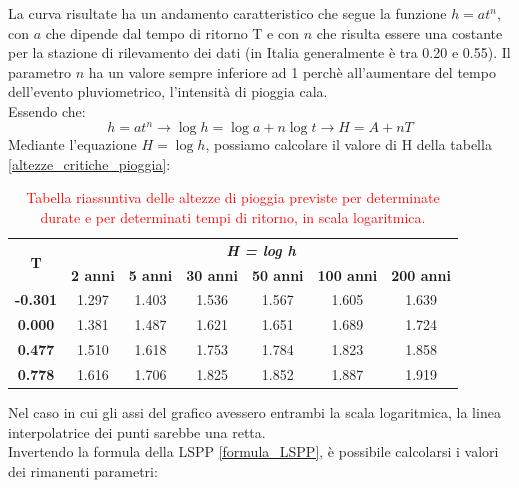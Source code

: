 La curva risultate ha un andamento caratteristico che segue la funzione $h=at^n$, con $a$ che dipende dal tempo di ritorno T e con $n$ che risulta essere una costante per la stazione di rilevamento dei dati (in Italia generalmente è tra 0.20 e 0.55). Il parametro $n$ ha un valore sempre inferiore ad 1 perchè all'aumentare del tempo dell'evento pluviometrico, l'intensità di pioggia cala.\\
Essendo che:
\begin{equation}
    h=at^n \rightarrow \log h = \log a + n \log t \rightarrow H=A+nT
    \label{formula_LSPP}
\end{equation}
Mediante l'equazione $H = \log h$, possiamo calcolare il valore di H della tabella \ref{altezze_critiche_pioggia}:

\begin{table}[H] \centering
    \caption{\textcolor{red}{Tabella riassuntiva delle altezze di pioggia previste per determinate durate e per determinati tempi di ritorno, in scala logaritmica.}}
    \begin{tabular}{ccccccc}
        \toprule
    \multirow{2}{*}{\textbf{T}} & \multicolumn{6}{c}{\textit{\textbf{H = log h}}}                                                            \\ & \textbf{2 anni} & \textbf{5 anni} & \textbf{30 anni} & \textbf{50 anni} & \textbf{100 anni} & \textbf{200 anni} \\
    \textbf{-0.301}             & 1.297           & 1.403           & 1.536            & 1.567            & 1.605             & 1.639             \\
    \textbf{0.000}              & 1.381           & 1.487           & 1.621            & 1.651            & 1.689             & 1.724             \\
    \textbf{0.477}              & 1.510           & 1.618           & 1.753            & 1.784            & 1.823             & 1.858             \\
    \textbf{0.778}              & 1.616           & 1.706           & 1.825            & 1.852            & 1.887             & 1.919  \\
    \bottomrule          
    \end{tabular}
    \end{table}
Nel caso in cui gli assi del grafico avessero entrambi la scala logaritmica, la linea interpolatrice dei punti sarebbe una retta.\\
Invertendo la formula della LSPP \ref{formula_LSPP}, è possibile calcolarsi i valori dei rimanenti parametri:
